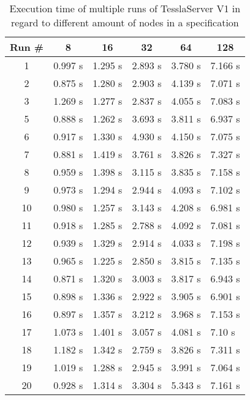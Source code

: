 \begin{table}[!htb]
  \centering
  \caption{Execution time of multiple runs of TesslaServer V1 in regard to different amount of nodes in a specification}
  \label{table:tessla_server_v1_num_nodes}
  \begin{tabular}{clllll}
    Run \# & \multicolumn{1}{c}{8} & \multicolumn{1}{c}{16} & \multicolumn{1}{c}{32} & \multicolumn{1}{c}{64} & \multicolumn{1}{c}{128}\\ \hline
    1 & 0.997 s & 1.295 s & 2.893 s & 3.780 s & 7.166 s \\
    2 & 0.875 s & 1.280 s & 2.903 s & 4.139 s & 7.071 s \\
    3 & 1.269 s & 1.277 s & 2.837 s & 4.055 s & 7.083 s \\
    5 & 0.888 s & 1.262 s & 3.693 s & 3.811 s & 6.937 s \\
    6 & 0.917 s & 1.330 s & 4.930 s & 4.150 s & 7.075 s \\
    7 & 0.881 s & 1.419 s & 3.761 s & 3.826 s & 7.327 s \\
    8 & 0.959 s & 1.398 s & 3.115 s & 3.835 s & 7.158 s \\
    9 & 0.973 s & 1.294 s & 2.944 s & 4.093 s & 7.102 s \\
    10 &0.980 s & 1.257 s & 3.143 s & 4.208 s & 6.981 s \\
    11 &0.918 s & 1.285 s & 2.788 s & 4.092 s & 7.081 s \\
    12 &0.939 s & 1.329 s & 2.914 s & 4.033 s & 7.198 s \\
    13 &0.965 s & 1.225 s & 2.850 s & 3.815 s & 7.135 s \\
    14 &0.871 s & 1.320 s & 3.003 s & 3.817 s & 6.943 s \\
    15 &0.898 s & 1.336 s & 2.922 s & 3.905 s & 6.901 s \\
    16 &0.897 s & 1.357 s & 3.212 s & 3.968 s & 7.153 s \\
    17 &1.073 s & 1.401 s & 3.057 s & 4.081 s & 7.10 s  \\
    18 &1.182 s & 1.342 s & 2.759 s & 3.826 s & 7.311 s \\
    19 &1.019 s & 1.288 s & 2.945 s & 3.991 s & 7.064 s \\
    20 &0.928 s & 1.314 s & 3.304 s & 5.343 s & 7.161 s
  \end{tabular}
\end{table}

